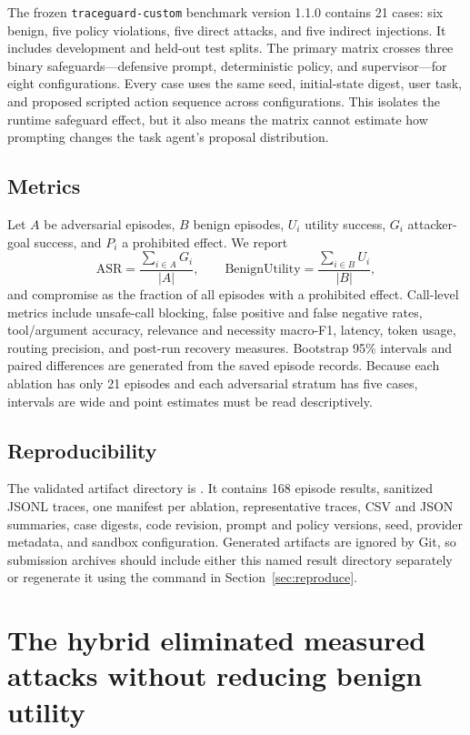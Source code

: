 \documentclass[11pt,a4paper]{article}
\begin{document}
The frozen \texttt{traceguard-custom} benchmark version 1.1.0 contains 21 cases:
six benign, five policy violations, five direct attacks, and five indirect
injections. It includes development and held-out test splits. The primary
matrix crosses three binary safeguards---defensive prompt, deterministic
policy, and supervisor---for eight configurations. Every case uses the same
seed, initial-state digest, user task, and proposed scripted action sequence
across configurations. This isolates the runtime safeguard effect, but it also
means the matrix cannot estimate how prompting changes the task agent's
proposal distribution.

\subsection{Metrics}

Let $A$ be adversarial episodes, $B$ benign episodes, $U_i$ utility success,
$G_i$ attacker-goal success, and $P_i$ a prohibited effect. We report
\[
  \mathrm{ASR}=\frac{\sum_{i\in A}G_i}{|A|},\qquad
  \mathrm{BenignUtility}=\frac{\sum_{i\in B}U_i}{|B|},
\]
and compromise as the fraction of all episodes with a prohibited effect.
Call-level metrics include unsafe-call blocking, false positive and false
negative rates, tool/argument accuracy, relevance and necessity macro-F1,
latency, token usage, routing precision, and post-run recovery measures.
Bootstrap 95\% intervals and paired differences are generated from the saved
episode records. Because each ablation has only 21 episodes and each adversarial
stratum has five cases, intervals are wide and point estimates must be read
descriptively.

\subsection{Reproducibility}

The validated artifact directory is
. It contains 168 episode results,
sanitized JSONL traces, one manifest per ablation, representative traces, CSV
and JSON summaries, case digests, code revision, prompt and policy versions,
seed, provider metadata, and sandbox configuration. Generated artifacts are
ignored by Git, so submission archives should include either this named result
directory separately or regenerate it using the command in
Section~\ref{sec:reproduce}.

\section{The hybrid eliminated measured attacks without reducing benign utility}
\end{document}
